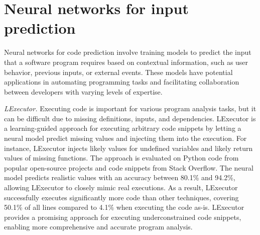 \section{Neural networks for input prediction}
Neural networks for code prediction involve training models to predict the input that a software program requires based on contextual information, such as user behavior, previous inputs, or external events.
These models have potential applications in automating programming tasks and facilitating collaboration between developers with varying levels of expertise.

\textit{LExecutor.} Executing code is important for various program analysis tasks, but it can be difficult due to missing definitions, inputs, and dependencies. LExecutor is a learning-guided approach for executing arbitrary code snippets by letting a neural model predict missing values and injecting them into the execution. For instance, LExecutor injects likely values for undefined variables and likely return values of missing functions. The approach is evaluated on Python code from popular open-source projects and code snippets from Stack Overflow. The neural model predicts realistic values with an accuracy between 80.1\% and 94.2\%, allowing LExecutor to closely mimic real executions. As a result, LExecutor successfully executes significantly more code than other techniques, covering 50.1\% of all lines compared to 4.1\% when executing the code as-is. LExecutor provides a promising approach for executing underconstrained code snippets, enabling more comprehensive and accurate program analysis. \cite{LExecutor_2023}
